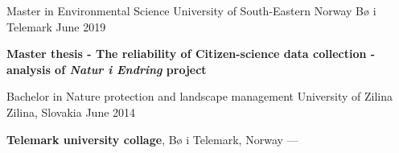 
\begin{cventries}
  \cventry
    {Master in Environmental Science} %
    {University of South-Eastern Norway} %
    {Bø i Telemark} %
    {June 2019} %
    {
      \begin{cvitems}
        \item  {\textbf{Master thesis - The reliability of Citizen-science data collection - analysis of \textit{Natur i Endring} project}}
      \end{cvitems}
    }
    
  \vspace{0.5mm}
  \cventry
    {Bachelor in Nature protection and landscape management} %
    {University of Zilina} %
    {Zilina, Slovakia} %
    {June 2014} %
    {
      \begin{cvitems} %
         \item {\textbf{Telemark university collage}, Bø i Telemark, Norway --- }
      \end{cvitems}
    }
    
\end{cventries}
